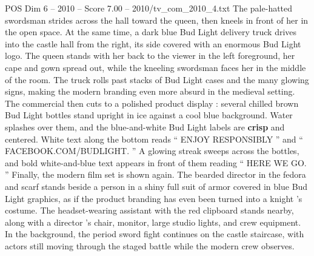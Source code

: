 \begin{textsample}{POS Dim 6 – 2010 – Score 7.00 – 2010/tv\_com\_2010\_4.txt}
The pale-hatted swordsman strides across the hall toward the queen, then kneels in front of her in the open space.
At the same time, a dark blue Bud Light delivery truck drives into the castle hall from the right, its side covered with an enormous Bud Light logo.
The queen stands with her back to the viewer in the left foreground, her cape and gown spread out, while the kneeling swordsman faces her in the middle of the room.
The truck rolls past stacks of Bud Light cases and the many glowing signs, making the modern branding even more absurd in the medieval setting.
The commercial then cuts to a polished product display : several chilled brown Bud Light bottles stand upright in ice against a cool blue background.
Water splashes over them, and the blue-and-white Bud Light labels are \textbf{crisp} and centered.
White text along the bottom reads “ ENJOY RESPONSIBLY ” and “ FACEBOOK.COM/BUDLIGHT. ” A glowing streak sweeps across the bottles, and bold white-and-blue text appears in front of them reading “ HERE WE GO. ” Finally, the modern film set is shown again.
The bearded director in the fedora and scarf stands beside a person in a shiny full suit of armor covered in blue Bud Light graphics, as if the product branding has even been turned into a knight ’s costume.
The headset-wearing assistant with the red clipboard stands nearby, along with a director ’s chair, monitor, large studio lights, and crew equipment.
In the background, the period sword fight continues on the castle staircase, with actors still moving through the staged battle while the modern crew observes.

\end{textsample}
